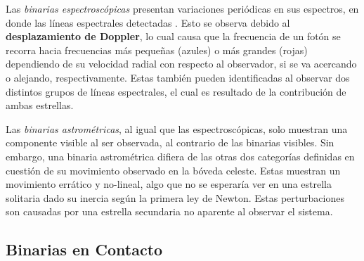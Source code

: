 Las \textit{binarias espectroscópicas} presentan variaciones periódicas en sus
espectros, en donde las líneas espectrales detectadas 
\citet{astronomyPhysicalPerspective::chapter5_binaryStars}. Esto se observa
debido al \textbf{desplazamiento de Doppler}, lo cual causa que la frecuencia de
un fotón se recorra hacia frecuencias más pequeñas (azules) o más grandes
(rojas) dependiendo de su velocidad radial con respecto al observador, si se va
acercando o alejando, respectivamente. Estas también pueden identificadas al
observar dos distintos grupos de líneas espectrales, el cual es resultado de la
contribución de ambas estrellas.

Las \textit{binarias astrométricas}, al igual que las espectroscópicas, solo
muestran una componente visible al ser observada, al contrario de las binarias
visibles. Sin embargo, una binaria astrométrica difiera de las otras dos
categorías definidas en cuestión de su movimiento observado en la bóveda
celeste. Estas muestran un movimiento errático y no-lineal, algo que no se
esperaría ver en una estrella solitaria dado su inercia según la primera ley de
Newton. Estas perturbaciones son causadas por una estrella secundaria no
aparente al observar el sistema. 

\subsection{Binarias en Contacto}